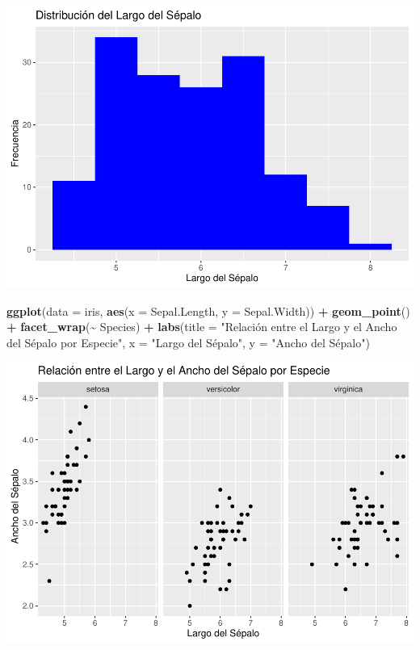\documentclass[
]{book}
\newenvironment{Shaded}{\begin{snugshade}}{\end{snugshade}}
\newcommand{\AttributeTok}[1]{\textcolor[rgb]{0.13,0.29,0.53}{#1}}
\newcommand{\FunctionTok}[1]{\textcolor[rgb]{0.13,0.29,0.53}{\textbf{#1}}}
\newcommand{\NormalTok}[1]{#1}
\newcommand{\SpecialCharTok}[1]{\textcolor[rgb]{0.81,0.36,0.00}{\textbf{#1}}}
\newcommand{\StringTok}[1]{\textcolor[rgb]{0.31,0.60,0.02}{#1}}
\begin{document}
\includegraphics{bookdown-demo_files/figure-latex/unnamed-chunk-180-1.pdf}

\begin{Shaded}
\begin{Highlighting}[]
\FunctionTok{ggplot}\NormalTok{(}\AttributeTok{data =}\NormalTok{ iris, }\FunctionTok{aes}\NormalTok{(}\AttributeTok{x =}\NormalTok{ Sepal.Length, }\AttributeTok{y =}\NormalTok{ Sepal.Width)) }\SpecialCharTok{+} 
  \FunctionTok{geom\_point}\NormalTok{() }\SpecialCharTok{+}
  \FunctionTok{facet\_wrap}\NormalTok{(}\SpecialCharTok{\textasciitilde{}}\NormalTok{ Species) }\SpecialCharTok{+}
  \FunctionTok{labs}\NormalTok{(}\AttributeTok{title =} \StringTok{"Relación entre el Largo y el Ancho del Sépalo por Especie"}\NormalTok{,}
       \AttributeTok{x =} \StringTok{"Largo del Sépalo"}\NormalTok{,}
       \AttributeTok{y =} \StringTok{"Ancho del Sépalo"}\NormalTok{)}
\end{Highlighting}
\end{Shaded}

\includegraphics{bookdown-demo_files/figure-latex/unnamed-chunk-181-1.pdf}
\end{document}
